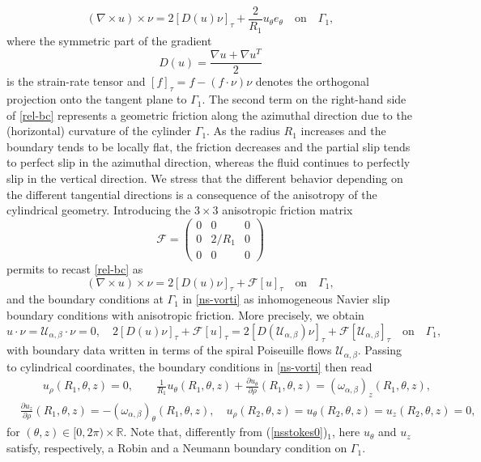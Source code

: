 \documentclass[a4paper,11pt]{amsart}
\numberwithin{equation}{section}
\numberwithin{figure}{section}
\def\eq#1{(\ref{#1})}
\begin{document}
	\begin{equation}\label{rel-bc}
		(	\nabla \times u) \times \nu = 2 \left[D(u)\nu\right]_\tau + \frac{2}{R_1}u_\theta e_\theta  \quad \text{on} \quad \Gamma_1,
	\end{equation}
	where the symmetric part of the gradient $$D(u)= \frac{\nabla u + \nabla u^T}{2} $$ is the strain-rate tensor and  $[f]_\tau=  f- (f\cdot \nu) \nu$ denotes the orthogonal projection onto the tangent plane to $\Gamma_1$. The second term on the right-hand side of \eqref{rel-bc} represents a geometric friction along the azimuthal direction due to the (horizontal) curvature of the cylinder $\Gamma_1$. As the radius $R_1$ increases and the boundary tends to be locally flat, the friction decreases and the partial slip tends to perfect slip in the azimuthal direction, whereas the fluid continues to perfectly slip in the vertical direction. We stress that the different behavior depending on the different tangential directions is a consequence of the anisotropy of the cylindrical geometry. Introducing the $3\times3$ anisotropic friction matrix  $$\mathcal{F}=\left(\begin{matrix}
		0&0&0\\0&2/R_1&0\\
		0&0&0
	\end{matrix}\right)$$ permits to recast \eqref{rel-bc} as
	\begin{equation}\label{Navier-bc}
		(	\nabla \times u)\times \nu = 2 \left[D(u)\nu\right]_\tau + \mathcal{F}\left[u\right]_\tau  \quad \text{on} \quad \Gamma_1,
	\end{equation}
	and the boundary conditions at $\Gamma_1$ in \eqref{ns-vorti} as inhomogeneous Navier slip boundary conditions with anisotropic friction. More precisely, we obtain
	\begin{equation}
		u\cdot \nu =\mathcal{U}_{\alpha,\beta}\cdot \nu =0, \quad 2 \left[D(u)\nu\right]_\tau + \mathcal{F}\left[u\right]_\tau = 2 \left[ D(\mathcal{U}_{\alpha,\beta})\nu\right]_\tau + \mathcal{F}\left[\mathcal{U}_{\alpha,\beta}\right]_\tau \quad \text{on}\quad \Gamma_1,\,
	\end{equation}with boundary data written in terms of the spiral Poiseuille flows $\mathcal{U}_{\alpha, \beta}$.
	Passing to cylindrical coordinates, the boundary conditions in \eqref{ns-vorti} then read
	\begin{equation}\label{bc-cylindrical}
		\begin{aligned}
			&\qquad u_\rho (R_1, \theta, z)=0, \qquad \frac{1}{R_1}u_\theta(R_1, \theta, z)+ \frac{\partial u_\theta}{\partial \rho}  (R_1, \theta, z)=(\omega_{\alpha, \beta})_z(R_1, \theta, z), \\ & \frac{\partial u_z}{\partial \rho} (R_1, \theta, z)= -(\omega_{\alpha, \beta})_\theta (R_1, \theta, z), \quad
			u_\rho (R_2, \theta, z)= u_\theta (R_2, \theta, z)= u_z (R_2, \theta, z)=0,
		\end{aligned}
	\end{equation}for $(\theta, z)\in [0,2\pi)\times \mathbb{R}$. Note that, differently from \eq{nsstokes0}$_1$, here $u_\theta$ and $u_z$ satisfy, respectively, a Robin and a Neumann boundary condition on $\Gamma_1$.
    
\end{document}
